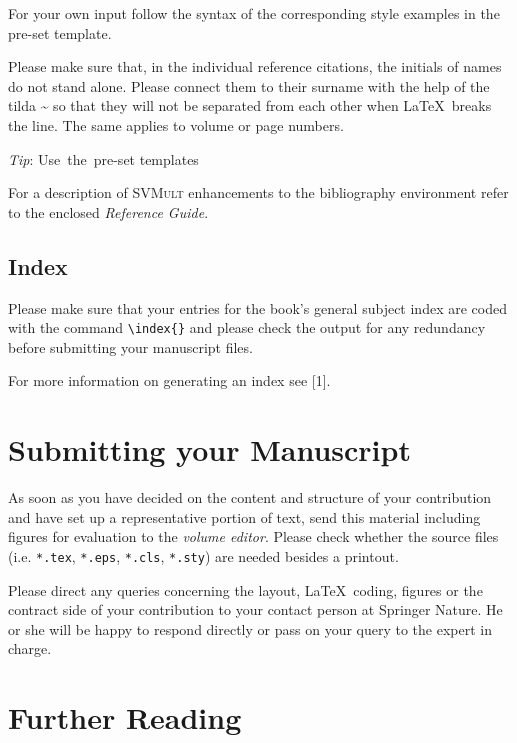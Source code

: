 \documentclass[graybox]{svmult}
\begin{document}
\begin{refguide}
\begin{sloppy}
\eject

For your own input follow the syntax of the corresponding style examples in the pre-set template.

Please make sure that, in the individual reference citations, the initials of names do not stand alone. Please connect them to their surname with the help of the tilda \~{} so that they will not be separated from each other when \LaTeX~breaks the line. The same applies to volume or page numbers.

\vspace*{-6.5pc}
\hspace*{29.5pc}\emph{Tip}:
\hspace*{29.5pc}\mbox{Use the pre-set}
\hspace*{29.5pc}\mbox{templates}

\vspace*{3pc}
For a description of \textsc{SVMult} enhancements to the bibliography environment refer to the enclosed \emph{Reference Guide}.

\subsection{Index}

Please make sure that your entries for the book's general subject index are coded with the command \verb|\index{}| and please check the output for any redundancy before submitting your manuscript files.

For more information on generating an index see [1].


\enlargethispage{12pt}

\section{Submitting your Manuscript}

As soon as you have decided on the content and structure of your contribution and have set up a representative portion of text, send this material including figures for evaluation to the \emph{volume editor}. Please check whether the source files (i.e. \verb|*.tex|, \verb|*.eps|, \verb|*.cls|, \verb|*.sty|) are needed besides a printout.

Please direct any queries concerning the layout, \LaTeX~coding, figures or the contract side of your contribution to your contact person at Springer Nature. He or she will be happy to respond directly or pass on your query to the expert in charge.

\section*{Further Reading}


\end{sloppy}
\end{refguide}
\end{document}
